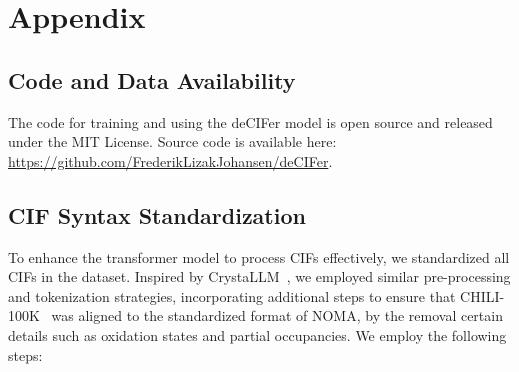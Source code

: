 \section{Appendix}

\subsection{Code and Data Availability} \label{sec:CodeAndData}

The code for training and using the deCIFer model is open source and released under the MIT License. Source code is available here: \url{https://github.com/FrederikLizakJohansen/deCIFer}.

\subsection{CIF Syntax Standardization}\label{sup-sec:cif_standardization}

To enhance the transformer model to process CIFs effectively, we standardized all CIFs in the dataset. Inspired by CrystaLLM~\cite{antunes2024crystalstructuregenerationautoregressive}, we employed similar pre-processing and tokenization strategies, incorporating additional steps to ensure that CHILI-100K~\cite{FriisJensenJohansen2024} was aligned to the standardized format of NOMA, by the removal certain details such as oxidation states and partial occupancies. We employ the following steps:

